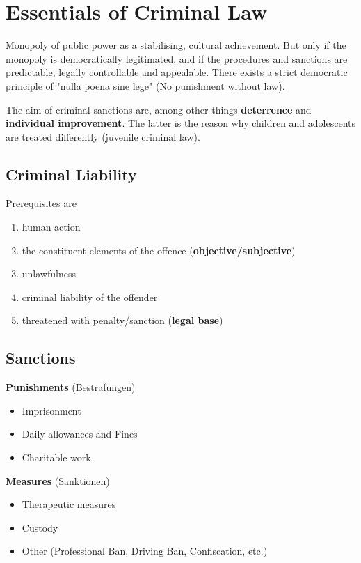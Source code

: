 \documentclass[11pt]{article}
\theoremstyle{definition}
\begin{document}
\section{Essentials of Criminal Law}
Monopoly of public power as a stabilising, cultural achievement. But only if the monopoly is democratically legitimated, and if the procedures and sanctions are predictable, legally controllable and appealable. There exists a strict democratic principle of "nulla poena sine lege" (No punishment without law).

The aim of criminal sanctions are, among other things \textbf{deterrence} and \textbf{individual improvement}. The latter is the reason why children and adolescents are treated differently (juvenile criminal law).

\subsection{Criminal Liability}
Prerequisites are
\begin{enumerate}
	\item human action
	\item the constituent elements of the offence (\textbf{objective/subjective})
	\item unlawfulness
	\item criminal liability of the offender
	\item threatened with penalty/sanction (\textbf{legal base})
\end{enumerate}

\subsection{Sanctions}
\textbf{Punishments} (Bestrafungen)
\begin{itemize}
	\item Imprisonment
	\item Daily allowances and Fines
	\item Charitable work
\end{itemize}

\vspace{1em}
\noindent
\textbf{Measures} (Sanktionen)
\begin{itemize}
	\item Therapeutic measures
	\item Custody
	\item Other (Professional Ban, Driving Ban, Confiscation, etc.)
\end{itemize}
\end{document}
